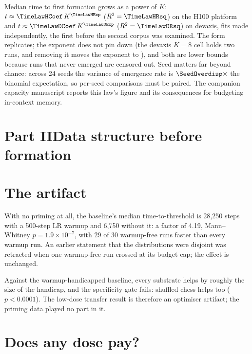 \documentclass{article}
\begin{document}
Median time to first formation grows as a power of $K$: $t \approx
\TimeLawHCoef\,K^{\TimeLawHExp}$ ($R^2=\TimeLawHRsq$) on the H100 platform and $t \approx
\TimeLawDCoef\,K^{\TimeLawDExp}$ ($R^2=\TimeLawDRsq$) on devaxis, fits made independently,
the first before the second corpus was examined. The form replicates; the exponent does not
pin down (the devaxis $K{=}8$ cell holds two runs, and removing it moves the exponent to
\TimeLawExpNoKeight), and both are lower bounds because runs that never emerged are censored
out. Seed matters far beyond chance: across 24 seeds the variance of emergence rate is
$\SeedOverdisp\times$ the binomial expectation, so per-seed comparisons must be paired. The
companion capacity manuscript reports this law's figure and its consequences for budgeting
in-context memory.

\section*{Part II\quad Data structure before formation}

\section{The artifact}
\label{sec:artifact}

With no priming at all, the baseline's median time-to-threshold is 28{,}250 steps with a
500-step LR warmup and 6{,}750 without it: a factor of 4.19, Mann--Whitney
$p=1.9\times10^{-7}$, with 29 of 30 warmup-free runs faster than every warmup run. An
earlier statement that the distributions were disjoint was retracted when one warmup-free
run crossed at its budget cap; the effect is unchanged.

Against the warmup-handicapped baseline, every substrate helps by roughly the size of the
handicap, and the specificity gate fails: shuffled chess helps too ($p<0.0001$). The
low-dose transfer result is therefore an optimiser artifact; the priming data played no part
in it.

\section{Does any dose pay?}
\label{sec:nopay}
\end{document}
